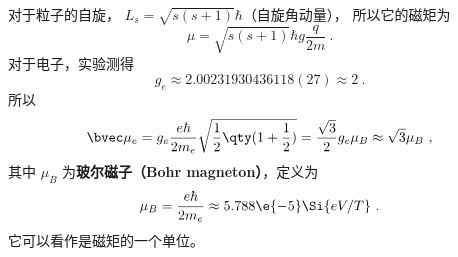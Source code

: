 对于粒子的自旋， $L_s = \sqrt{s(s + 1)}\hbar$（自旋角动量）， 所以它的磁矩为
\begin{equation}
\mu = \sqrt{s (s + 1)} \hbar g\frac{q}{2m}~.
\end{equation}
对于电子，实验测得
\begin{equation}
g_e \approx 2.00231930436118(27) \approx 2~.
\end{equation}
所以
\begin{equation}
\bvec \mu_e  = g_e \frac{e\hbar}{2 m_e} \sqrt{\frac12 \qty(1 + \frac12)}  = \frac{\sqrt 3}{2} g_e \mu_B \approx \sqrt 3 \mu_B~,
\end{equation}
其中 $\mu_B$ 为\textbf{玻尔磁子（Bohr magneton）}，定义为
\begin{equation}
\mu_B = \frac{e\hbar}{2 m_e} \approx 5.788\e{-5} \Si{eV/T}~.
\end{equation}
它可以看作是磁矩的一个单位。
